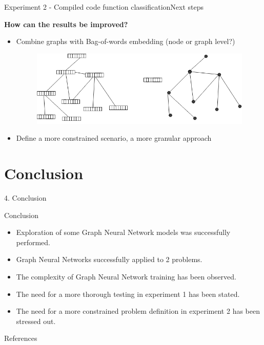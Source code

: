 \documentclass[xcolor=table]{beamer}
\begin{document}
\begin{frame}{Experiment 2 - Compiled code function classification}{Next steps}

\textbf{How can the results be improved?}
\begin{itemize}
    \item Combine graphs with Bag-of-words embedding (node or graph level?)
    \begin{figure}[H]

      \centering
        \includegraphics[width=0.9\linewidth]{img/exp2_improvements.png}

    \end{figure}

    \item Define a more constrained scenario, a more granular approach
\end{itemize}

\end{frame}


\section{Conclusion}
\begin{frame}{ }
\huge{4. Conclusion}
\end{frame}




\begin{frame}{Conclusion}%

\begin{itemize}
    \item Exploration of some Graph Neural Network models was successfully performed.
    \item Graph Neural Networks successfully applied to 2 problems. %
    \item The complexity of Graph Neural Network training has been observed.
    \item The need for a more thorough testing in experiment 1 has been stated.
    \item The need for a more constrained problem definition in experiment 2 has been stressed out.

\end{itemize}

\end{frame}



\begin{frame}[allowframebreaks]{References}





\end{frame}
\end{document}
